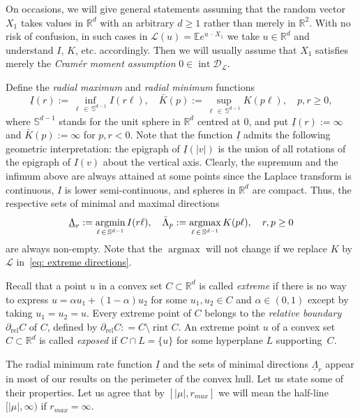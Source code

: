 \documentclass[AHL,Unicode,published]{cedram}
\DeclareMathOperator{\rint}{rint}
\DeclareMathOperator{\intr}{int}
\DeclareMathOperator{\rel}{rel}
\newcommand{\ubar}[1]{\underline{#1}}
\newcommand{\Rbb}{\mathbb{R}}
\newcommand{\E}{\mathbb{E}}
\newcommand{\Sbb}{\mathbb{S}}
\newcommand{\Dcl}{\mathcal{D}}
\newcommand{\Lcl}{\mathcal{L}}
\newcommand{\argmax}{\mathop{\mathrm{argmax}}\nolimits}
\newcommand{\argmin}{\mathop{\mathrm{argmin}}\nolimits}
\begin{document}
On occasions, we will give general statements assuming that the random vector $X_1$ takes values in $\Rbb^d$ with an arbitrary $d \ge 1$ rather than merely in $\Rbb^2$. With no risk of confusion, in such cases in $\Lcl(u)= \E e^{u\,\cdot\,X_1}$ we take $u \in \Rbb^d$ and understand $I$, $K$, etc. accordingly. Then we will usually assume that $X_1$ satisfies merely the \emph{Cram\'er moment assumption} $0 \in \intr \Dcl_{\Lcl}$.

Define the \emph{radial maximum} and \emph{radial minimum} functions
\begin{equation}\label{eq: radial functions}
\ubar{I}(r):= \inf_{\ell\,\in\,\Sbb^{d-1}} I(r\ell), \quad \bar K(p):= \sup_{\ell\,\in\,\Sbb^{d-1}} K(p\ell), \quad p, r \ge 0,
\end{equation}
where $\Sbb^{d-1}$ stands for the unit sphere in $\Rbb^d$ centred at $0$, and put $\ubar I(r):= \infty$ and $\bar K(p) := \infty$ for $p, r<0$. Note that the function $\ubar I$ admits the following geometric interpretation: the epigraph of $\ubar I(|v|)$ is the union of all rotations of the epigraph of $I(v)$ about the vertical axis. Clearly, the supremum and the infimum above are always attained at some points since the Laplace transform is continuous, $I$ is lower semi-continuous, and spheres in $\Rbb^d$ are compact. Thus, the respective sets of minimal and maximal directions
\begin{equation}\label{eq: extreme directions}
\ubar{\Lambda}_r:=\argmin \limits_{\ell\,\in\,\Sbb^{d-1}} I(r \ell), \quad \bar{\Lambda}_p:= \argmax \limits_{\ell\,\in\, \Sbb^{d-1}} K(p \ell), \quad r,p \ge 0
\end{equation}
are always non-empty. Note that the $\argmax$ will not change if we replace $K$ by $\Lcl$ in~\eqref{eq: extreme directions}.



Recall that a point $u$ in a convex set $C \subset \Rbb^d$ is called \emph{extreme} if there is no way to express $u = \alpha u_1 + (1- \alpha) u_2$ for some $u_1, u_2 \in C$ and $\alpha \in (0,1)$ except by taking $u_1=u_2=u$. Every extreme point of $C$ belongs to the \emph{relative boundary} $\partial_{\rel} C$ of $C$, defined by $\partial_{\rel} C: =C \setminus \rint C$. An extreme point $u$ of a convex set $C \subset \Rbb^d$ is called \emph{exposed} if $C \cap L = \{ u \}$ for some hyperplane $L$ supporting~$C$.

The radial minimum rate function $\ubar{I}$ and the sets of minimal directions $\ubar{\Lambda}_r$ appear in most of our results on the perimeter of the convex hull. Let us state some of their properties. Let us agree that by $[|\mu|, r_{max}]$ we will mean the half-line $[|\mu|, \infty)$ if $r_{max}=\infty$.
\end{document}
